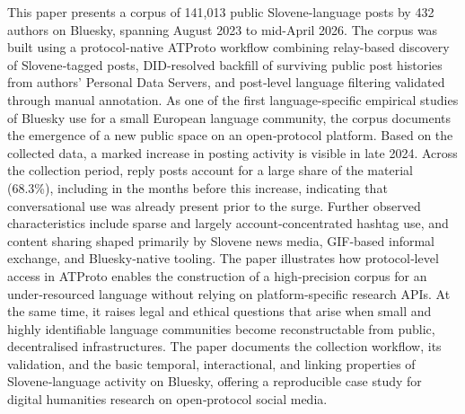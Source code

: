 This paper presents a corpus of 141,013 public Slovene-language posts by 432 authors on Bluesky, spanning August 2023 to mid-April 2026. The corpus was built using a protocol-native ATProto workflow combining relay-based discovery of Slovene‑tagged posts, DID‑resolved backfill of surviving public post histories from authors’ Personal Data Servers, and post‑level language filtering validated through manual annotation.
As one of the first language-specific empirical studies of Bluesky use for a small European language community, the corpus documents the emergence of a new public space on an open‑protocol platform. Based on the collected data, a marked increase in posting activity is visible in late 2024. Across the collection period, reply posts account for a large share of the material (68.3\%), including in the months before this increase, indicating that conversational use was already present prior to the surge. Further observed characteristics include sparse and largely account‑concentrated hashtag use, and content sharing shaped primarily by Slovene news media, GIF‑based informal exchange, and Bluesky‑native tooling.
The paper illustrates how protocol‑level access in ATProto enables the construction of a high‑precision corpus for an under‑resourced language without relying on platform‑specific research APIs. At the same time, it raises legal and ethical questions that arise when small and highly identifiable language communities become reconstructable from public, decentralised infrastructures. The paper documents the collection workflow, its validation, and the basic temporal, interactional, and linking properties of Slovene‑language activity on Bluesky, offering a reproducible case study for digital humanities research on open‑protocol social media.